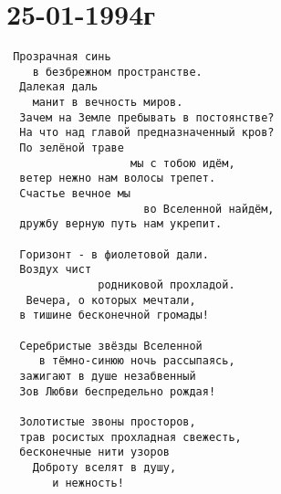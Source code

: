 \chapter{25-01-1994г}

\begin{verbatim} 
 Прозрачная синь
    в безбрежном пространстве.
  Далекая даль
    манит в вечность миров.
  Зачем на Земле пребывать в постоянстве?
  На что над главой предназначенный кров?
  По зелёной траве
                   мы с тобою идём,
  ветер нежно нам волосы трепет.
  Счастье вечное мы
                     во Вселенной найдём,
  дружбу верную путь нам укрепит.

  Горизонт - в фиолетовой дали.
  Воздух чист
              родниковой прохладой.
   Вечера, о которых мечтали,
  в тишине бесконечной громады!

  Серебристые звёзды Вселенной
     в тёмно-синюю ночь рассыпаясь,
  зажигают в душе незабвенный
  Зов Любви беспредельно рождая!

  Золотистые звоны просторов,
  трав росистых прохладная свежесть,
  бесконечные нити узоров
    Доброту вселят в душу, 
       и нежность!
   
\end{verbatim}
\author{Александр Ефремов}


